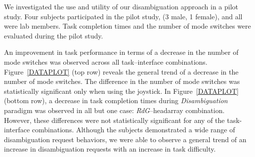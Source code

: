 \documentclass[conference]{IEEEtran}
\begin{document}
%
% 
% 
We investigated the use and utility of our disambiguation approach in a pilot study. Four subjects participated in the pilot study, (3 male, 1 female), and all were lab members.  
Task completion times and the number of mode switches were evaluated during the pilot study. 

An improvement in task performance in terms of a decrease in the number of mode switches was observed across all task--interface combinations. 
Figure~\ref{DATAPLOT} (top row) reveals the general trend of a decrease in the number of mode switches. The difference in the number of mode switches was statistically significant only when using the joystick. In Figure~\ref{DATAPLOT} (bottom row), a decrease in task completion times during \textit{Disambiguation} paradigm was observed in all but one case: \textit{RdG}--headarray combination. However, these differences were not statistically significant for any of the task-interface combinations. Although the subjects demonstrated a wide range of disambiguation request behaviors, we were able to observe a general trend of an increase in disambiguation requests with an increase in task difficulty.
\end{document}
